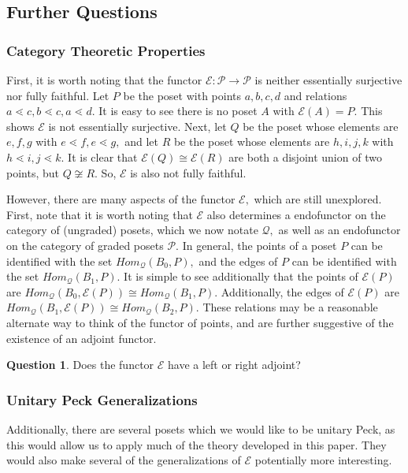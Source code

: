 \documentclass[10 pt]{amsart}
\theoremstyle{plain}
\theoremstyle{definition}
\newtheorem{question}[thm]{Question}
\theoremstyle{remark}
\numberwithin{equation}{section}
\newcommand\ssec{\subsection}
\newcommand\sssec{\subsubsection}
\begin{document}
\ssec{Further Questions}

\sssec{Category Theoretic Properties}

First, it is worth noting that the functor $\mathcal E:\mathcal P \rightarrow \mathcal P$ is neither essentially surjective nor fully faithful. Let $P$ be the poset with points $a,b,c,d$ and relations $a \lessdot c, b \lessdot c, a \lessdot d.$ It is easy to see there is no poset $A$ with $\mathcal E(A) = P.$ This shows $\mathcal E$ is not essentially surjective. Next, let $Q$ be the poset whose elements are $e,f,g$ with $e \lessdot f, e \lessdot g,$ and let $R$ be the poset whose elements are $h,i,j,k$ with $h \lessdot i, j \lessdot k.$ It is clear that $\mathcal E(Q) \cong \mathcal E(R)$ are both a disjoint union of two points, but $Q \not \cong R.$ So, $\mathcal E$ is also not fully faithful.

However, there are many aspects of the functor $\mathcal E,$ which are still unexplored. First, note that it is worth noting that $\mathcal E$ also determines a endofunctor on the category of (ungraded)
 posets, which we now notate $\mathcal Q,$ as well as an endofunctor on the category of graded posets $\mathcal P.$ In general, the points of a poset $P$ can be identified with the set $Hom_{\mathcal Q}(B_0,P),$ and the edges of $P$ can be identified with the set $Hom_{\mathcal Q}(B_1,P).$ It is simple to see additionally that the points of $\mathcal E(P)$ are $Hom_{\mathcal Q}(B_0,\mathcal E(P)) \cong Hom_{\mathcal Q}(B_1,P).$ Additionally, the edges of $\mathcal E(P)$ are $Hom_{\mathcal Q}(B_1,\mathcal E(P)) \cong Hom_{\mathcal Q}(B_2,P).$ These relations may be a reasonable alternate way to think of the functor of points, and are further suggestive of the existence of an adjoint functor.

\begin{question}
Does the functor $\mathcal E$ have a left or right adjoint?
\end{question}

\sssec{Unitary Peck Generalizations}

Additionally, there are several posets which we would like to be unitary  
Peck, as this would allow us to apply much of the theory developed in this paper. They would also make several of the generalizations of $\mathcal E$ potentially more interesting.
\end{document}
